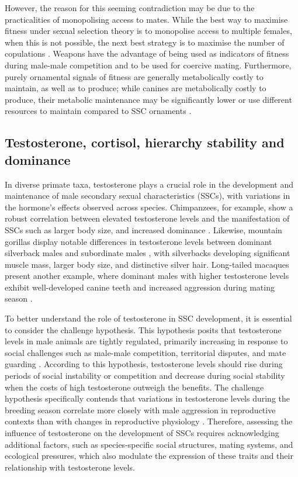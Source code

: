 However, the reason for this seeming contradiction may be due to the practicalities of monopolising access to mates. While the best way to maximise fitness under sexual selection theory is to monopolise access to multiple females,  when this is not possible, the next best strategy is to maximise the number of copulations \citep{Setchell.2016}. Weapons have the advantage of being used as indicators of fitness during male-male competition and to be used for coercive mating. Furthermore, purely ornamental signals of fitness are generally metabolically costly to maintain, as well as to produce; while canines are metabolically costly to produce, their metabolic maintenance may be significantly lower or use different resources to maintain compared to SSC ornaments \citep{Lüpold.2019}. 

\subsection{Testosterone, cortisol, hierarchy stability and dominance}

In diverse primate taxa, testosterone plays a crucial role in the development and maintenance of male secondary sexual characteristics (SSCs), with variations in the hormone's effects observed across species. Chimpanzees, for example, show a robust correlation between elevated testosterone levels and the manifestation of SSCs such as larger body size, and increased dominance \citep{Dixson}. Likewise, mountain gorillas display notable differences in testosterone levels between dominant silverback males and subordinate males \citep{Robbins.2004}, with silverbacks developing significant muscle mass, larger body size, and distinctive silver hair. Long-tailed macaques present another example, where dominant males with higher testosterone levels exhibit well-developed canine teeth and increased aggression during mating season \citep{Girard-Buttoz.2014}.

To better understand the role of testosterone in SSC development, it is essential to consider the challenge hypothesis. This hypothesis posits that testosterone levels in male animals are tightly regulated, primarily increasing in response to social challenges such as male-male competition, territorial disputes, and mate guarding \citep{Wingfield.1990}. According to this hypothesis, testosterone levels should rise during periods of social instability or competition and decrease during social stability when the costs of high testosterone outweigh the benefits. The challenge hypothesis specifically contends that variations in testosterone levels during the breeding season correlate more closely with male aggression in reproductive contexts than with changes in reproductive physiology \citep{Wingfield.2020}. Therefore, assessing the influence of testosterone on the development of SSCs requires acknowledging additional factors, such as species-specific social structures, mating systems, and ecological pressures, which also modulate the expression of these traits and their relationship with testosterone levels.

